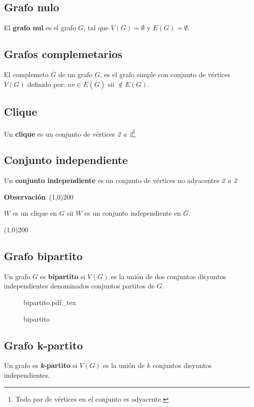 \documentclass[a4paper]{book}
\newcommand{\incfig}[2][1]{%
    \def\svgwidth{#1\columnwidth}
    {#2.pdf_tex}
}
\newenvironment{obs}
    {
        \begin{flushleft}
       \textbf{Observación}\
        \line(1,0){200} \
        \end{flushleft}
    }
    {
        \begin{flushright}
        \line(1,0){200}
        \end{flushright}
    }
\begin{document}
\subsection{Grafo nulo}
El \textbf{grafo nul} es el grafo \(G\), tal que \(V\left( G \right)
=\emptyset \text{ y } E\left(G\right)=\emptyset\).

\subsection{Grafos complemetarios}
El complemeto \(\overline{G}\) de un grafo \(G\), es el grafo simple con
conjunto de vértices \(V\left(G\right)\) definido por: \(uv\in
E\left(\overline{G}\right) \text{ sii } \not\in E\left(G\right)\).

\subsection{Clique}
Un \textbf{clique} es un conjunto de vértices \textit{2 a 2}\footnote{Todo par
de vértices en el conjunto es adyacente.}

\subsection{Conjunto independiente}
Un \textbf{conjunto independiente} es un conjunto de vértices no adyacentes \textit{2 a 2}

\begin{obs}
    \(W\) es un clique en \(G\) sii \(W\) es un conjunto independiente en
    \(\overline{G}\).
\end{obs}

\subsection{Grafo bipartito}
Un grafo \(G\) es \textbf{bipartito} si \(V\left( G \right) \) es la unión de
dos conjuntos disyuntos independientes denominados conjuntos partitos de \(G\).
\begin{figure}[ht]
    \centering
    \incfig{bipartito}
    \caption{bipartito}
    \label{fig:bipartito}
\end{figure}

\subsection{Grafo k-partito}
Un grafo es \textbf{\textit{k}-partito} si \(V\left(G\right)\) es la unión de
\(k\) conjuntos disyuntos independientes.
\end{document}
